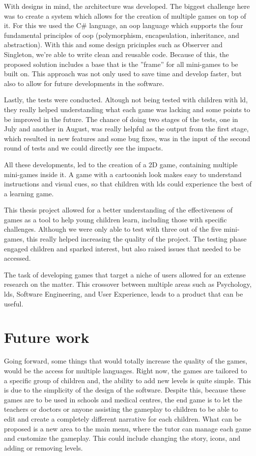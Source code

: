 With designs in mind, the architecture was developed. The biggest challenge here was to create a system which allows for the creation of multiple games on top of it. For this we used the C\# language, an \gls{oop} language which supports the four fundamental principles of \gls{oop} (polymorphism, encapsulation, inheritance, and abstraction). With this and some design pricinples such as Observer and Singleton, we're able to write clean and reusable code. Because of this, the proposed solution includes a base that is the ''frame'' for all mini-games to be built on. This approach was not only used to save time and develop faster, but also to allow for future developments in the software. 

Lastly, the tests were conducted. Altough not being tested with children with \gls{ld}, they really helped understanding what each game was lacking and some points to be improved in the future. The chance of doing two stages of the tests, one in July and another in August, was really helpful as the output from the first stage, which resulted in new features and some bug fixes, was in the input of the second round of tests and we could directly see the impacts.

All these developments, led to the creation of a 2D game, containing multiple mini-games inside it. A game with a cartoonish look makes easy to understand instructions and visual cues, so that children with \glspl{ld} could experience the best of a learning game.

This thesis project allowed for a better understanding of the effectiveness of games as a tool to help young children learn, including those with specific challenges. Although we were only able to test with three out of the five mini-games, this really helped increasing the quality of the project. The testing phase engaged children and sparked interest, but also raised issues that needed to be accessed.

The task of developing games that target a niche of users allowed for an extense research on the matter. This crossover between multiple areas such as Psychology, \glspl{ld}, Software Engineering, and User Experience, leads to a product that can be useful. 

\section{Future work}
\label{futureWork}

Going forward, some things that would totally increase the quality of the games, would be the access for multiple languages. Right now, the games are tailored to a specific group of children and, the ability to add new levels is quite simple. This is due to the simplicity of the design of the software. Despite this, because these games are to be used in schools and medical centres, the end game is to let the teachers or doctors or anyone assisting the gameplay to children to be able to edit and create a completely different narrative for each children. What can be proposed is a new area to the main menu, where the tutor can manage each game and customize the gameplay. This could include changing the story, icons, and adding or removing levels.

